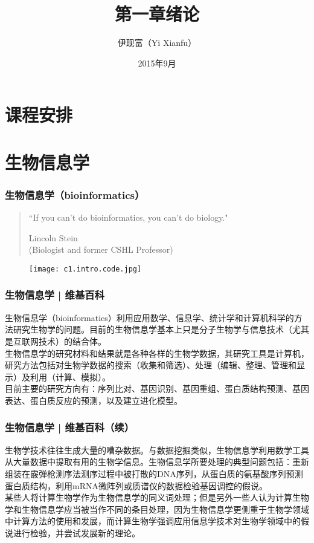 



\title[绪论]{第一章\quad 绪论}
\author[Yixf]{伊现富（Yi Xianfu）}
\date{2015年9月}



\section{课程安排}


\section{生物信息学}
\begin{frame}
  \frametitle{生物信息学（bioinformatics）}
  \begin{quotation}
    ``If you can't do bioinformatics, you can't do biology."
    \begin{flushright}
    Lincoln Stein\\
    (Biologist and former CSHL Professor)
  \end{flushright}
  \end{quotation}
  \vspace{-1em}
  \begin{figure}
    \centering
    \texttt{[image: c1.intro.code.jpg]}
  \end{figure}
\end{frame}

\begin{frame}
  \frametitle{生物信息学 | 维基百科}
  生物信息学（bioinformatics）利用应用数学、信息学、统计学和计算机科学的方法研究生物学的问题。目前的生物信息学基本上只是分子生物学与信息技术（尤其是互联网技术）的结合体。\\
  \vspace{1em}
  生物信息学的研究材料和结果就是各种各样的生物学数据，其研究工具是计算机，研究方法包括对生物学数据的搜索（收集和筛选）、处理（编辑、整理、管理和显示）及利用（计算、模拟）。\\
  \vspace{1em}
  目前主要的研究方向有：序列比对、基因识别、基因重组、蛋白质结构预测、基因表达、蛋白质反应的预测，以及建立进化模型。
\end{frame}

\begin{frame}
  \frametitle{生物信息学 | 维基百科（续）}
  生物学技术往往生成大量的嘈杂数据。与数据挖掘类似，生物信息学利用数学工具从大量数据中提取有用的生物学信息。生物信息学所要处理的典型问题包括：重新组装在霰弹枪测序法测序过程中被打散的DNA序列，从蛋白质的氨基酸序列预测蛋白质结构，利用mRNA微阵列或质谱仪的数据检验基因调控的假说。\\
  \vspace{1em}
  某些人将计算生物学作为生物信息学的同义词处理；但是另外一些人认为计算生物学和生物信息学应当被当作不同的条目处理，因为生物信息学更侧重于生物学领域中计算方法的使用和发展，而计算生物学强调应用信息学技术对生物学领域中的假说进行检验，并尝试发展新的理论。
\end{frame}

